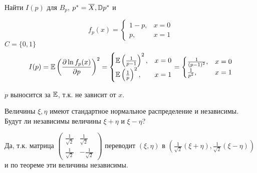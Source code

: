 

\cfoot{}



\begin{exercise}
    Найти \(I(p)\) для \(B_p\), \(p^* = \overline{X}, \mathbb{D} p^*\) и \?
\end{exercise}
\begin{solution}
    \[f_p(x) = \begin{cases}
            1 - p, & x = 0 \\
            p,     & x = 1
        \end{cases}\]
    \(C = \{0, 1\}\)
    \[I(p) = \mathbb{E} \left(\frac{\partial \ln f_p(x)}{\partial p}\right)^2 = \begin{cases}
            \mathbb{E} \left(\frac{1}{p - 1}\right)^2, & x = 0 \\
            \mathbb{E} \left(\frac{1}{p}\right)^2,     & x = 1
        \end{cases} = \begin{cases}
            \frac{1}{(p - 1)^2}, & x = 0 \\
            \frac{1}{p^2},       & x = 1
        \end{cases}\]

    \(p\) выносится за \(\mathbb{E}\), т.к. не зависит от \(x\).
\end{solution}

\begin{exercise}
    Величины \(\xi, \eta\) имеют стандартное нормальное распределение и независимы. Будут ли независимы величины \(\xi + \eta\) и \(\xi - \eta\)?
\end{exercise}
\begin{solution}
    Да, т.к. матрица \(\begin{pmatrix}
        \frac{1}{\sqrt{2}} & \frac{1}{\sqrt{2}}   \\
        \frac{1}{\sqrt{2}} & - \frac{1}{\sqrt{2}}
    \end{pmatrix}\) переводит \((\xi, \eta)\) в \((\frac{1}{\sqrt{2}}(\xi + \eta), \frac{1}{\sqrt{2}}(\xi - \eta))\) и по теореме эти величины независимы.
\end{solution}

